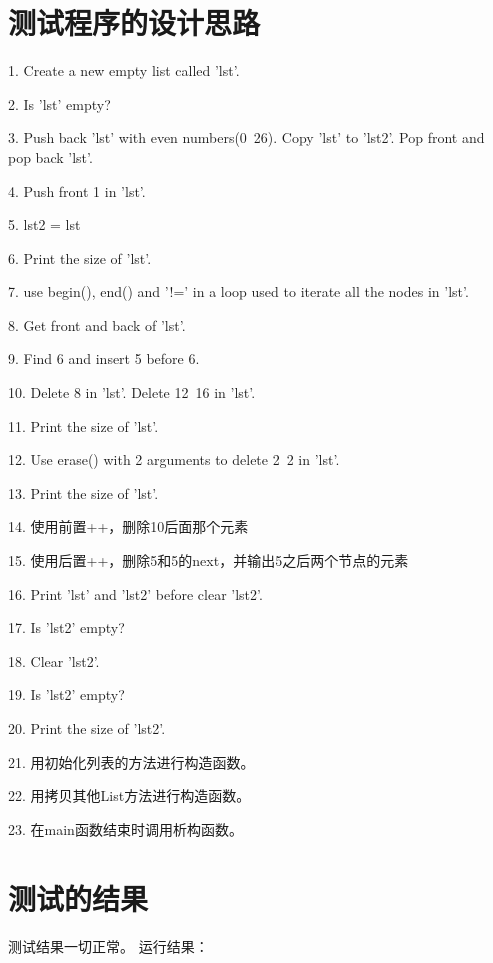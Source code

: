 \documentclass[UTF8]{ctexart}
\begin{document}
\pagestyle{fancy}
\fancyhead{}

\section{测试程序的设计思路}

1. Create a new empty list called 'lst'.

2. Is 'lst' empty?

3. Push back 'lst' with even numbers(0~26). Copy 'lst' to 'lst2'. Pop front and pop back 'lst'.

4. Push front 1 in 'lst'.

5. lst2 = lst

6. Print the size of 'lst'.

7. use begin(), end() and '!=' in a loop used to iterate all the nodes in 'lst'.

8. Get front and back of 'lst'.

9. Find 6 and insert 5 before 6.

10. Delete 8 in 'lst'. Delete 12~16 in 'lst'.

11. Print the size of 'lst'.

12. Use erase() with 2 arguments to delete 2~2 in 'lst'.

13. Print the size of 'lst'.

14. 使用前置++，删除10后面那个元素

15. 使用后置++，删除5和5的next，并输出5之后两个节点的元素

16. Print 'lst' and 'lst2' before clear 'lst2'.

17. Is 'lst2' empty?

18. Clear 'lst2'.

19. Is 'lst2' empty?

20. Print the size of 'lst2'.

21. 用初始化列表的方法进行构造函数。

22. 用拷贝其他List方法进行构造函数。

23. 在main函数结束时调用析构函数。

\section{测试的结果}

测试结果一切正常。
运行结果：
\end{document}
